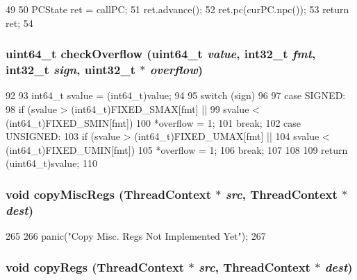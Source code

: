 \begin{DoxyCode}
49 {
50     PCState ret = callPC;
51     ret.advance();
52     ret.pc(curPC.npc());
53     return ret;
54 }
\end{DoxyCode}
\hypertarget{namespaceMipsISA_aa0232b8b21b63c7893efa2ccbe2ad833}{
\subsubsection[{checkOverflow}]{\setlength{\rightskip}{0pt plus 5cm}uint64\_\-t checkOverflow (uint64\_\-t {\em value}, \/  int32\_\-t {\em fmt}, \/  int32\_\-t {\em sign}, \/  {\bf uint32\_\-t} $\ast$ {\em overflow})}}
\label{namespaceMipsISA_aa0232b8b21b63c7893efa2ccbe2ad833}



\begin{DoxyCode}
92 {
93     int64_t svalue = (int64_t)value;
94 
95     switch (sign)
96     {
97       case SIGNED:
98         if (svalue > (int64_t)FIXED_SMAX[fmt] ||
99             svalue < (int64_t)FIXED_SMIN[fmt])
100             *overflow = 1;
101         break;
102       case UNSIGNED:
103         if (svalue > (int64_t)FIXED_UMAX[fmt] ||
104             svalue < (int64_t)FIXED_UMIN[fmt])
105             *overflow = 1;
106         break;
107     }
108 
109     return (uint64_t)svalue;
110 }
\end{DoxyCode}
\hypertarget{namespaceMipsISA_a42833096094e5ff0f2de948bf8e5965c}{
\subsubsection[{copyMiscRegs}]{\setlength{\rightskip}{0pt plus 5cm}void copyMiscRegs ({\bf ThreadContext} $\ast$ {\em src}, \/  {\bf ThreadContext} $\ast$ {\em dest})}}
\label{namespaceMipsISA_a42833096094e5ff0f2de948bf8e5965c}



\begin{DoxyCode}
265 {
266     panic("Copy Misc. Regs Not Implemented Yet\n");
267 }
\end{DoxyCode}
\hypertarget{namespaceMipsISA_aaeffcccf262b0dbd3cbcc8b4cef41168}{
\subsubsection[{copyRegs}]{\setlength{\rightskip}{0pt plus 5cm}void copyRegs ({\bf ThreadContext} $\ast$ {\em src}, \/  {\bf ThreadContext} $\ast$ {\em dest})}}
\label{namespaceMipsISA_aaeffcccf262b0dbd3cbcc8b4cef41168}



